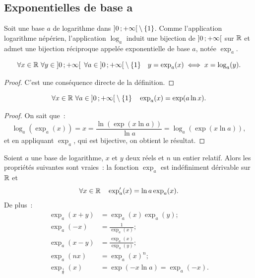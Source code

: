 \subsection{Exponentielles de base a}
\label{subsec:chap1-expa}
\begin{defdef}
  Soit une base \(a\) de logarithme dans \(\left] 0 \, ;  +\infty \right[\setminus\{1\}\). Comme l'application logarithme népérien, l'application \(\log_a\) induit une bijection de \(\left] 0 \, ;  +\infty \right[\) sur \(\mathbb{R}\) et admet une bijection réciproque appelée exponentielle de base \(a\), notée \(\exp_a\).
\end{defdef}
\begin{prop}
  \begin{equation}
    \forall x \in \mathbb{R} \ \forall y \in \left] 0 \, ;  +\infty \right[ \ \forall a \in \left] 0 \, ;  +\infty \right[\setminus\{1\} \quad y=\exp_a(x) \iff x=\log_a(y).
  \end{equation}
\end{prop}
\begin{proof}
  C'est une conséquence directe de la définition.
\end{proof}
%
\begin{prop}
  \begin{equation}
    \forall x \in \mathbb{R} \ \forall a \in \left] 0 \, ;  +\infty \right[\setminus\{1\} \quad \exp_a(x)=\exp(a\ln x).
  \end{equation}
\end{prop}
\begin{proof}
  On sait que~:
  \begin{equation}
    \log_a(\exp_a(x))=x=\frac{\ln(\exp(x \ln a))}{\ln a}=\log_a(\exp(x \ln a)),
  \end{equation}
  et en appliquant \(\exp_a\), qui est bijective, on obtient le résultat.
\end{proof}
%
\begin{prop}
  Soient \(a\) une base de logarithme, \(x\) et \(y\) deux réels et \(n\) un entier relatif. Alors les propriétés suivantes sont vraies~: la fonction \(\exp_a\) est indéfiniment dérivable sur \(\mathbb{R}\) et
  \begin{equation}
    \forall x \in \mathbb{R} \quad \exp_a'(x)=\ln a \exp_a(x).
  \end{equation}
 De plus~:
  \begin{align}
      \exp_a(x+y)&=\exp_a(x) \exp_a(y); \\
      \exp_a(-x)&=\frac{1}{\exp_a(x)}; \\
      \exp_a(x-y)&=\frac{\exp_a(x)}{\exp_a(y)}; \\
      \exp_a(nx)&=\exp_a(x)^n;\\
      \exp_{\frac{1}{a}}(x)&=\exp(-x \ln a)=\exp_a(-x).
  \end{align}
\end{prop}
